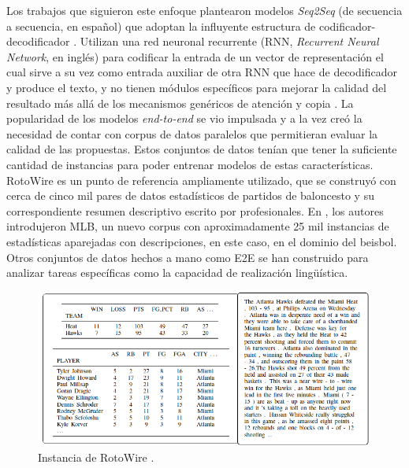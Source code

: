     Los trabajos que siguieron este enfoque  plantearon modelos \emph{Seq2Seq} (de secuencia a secuencia, en español) que adoptan la 
influyente estructura de codificador-decodificador . Utilizan una red neuronal recurrente (RNN, \emph{Recurrent Neural Network}, en inglés) 
para codificar la entrada de un vector de representación el cual sirve a su vez como entrada auxiliar de otra RNN que hace de decodificador y produce el texto, y no tienen módulos 
específicos para mejorar la calidad del resultado más allá de los mecanismos gen\'ericos de atención y copia . La popularidad de los modelos 
\emph{end-to-end} se vio impulsada y a la vez creó la necesidad de contar con corpus de datos paralelos que permitieran evaluar la calidad de las propuestas. Estos conjuntos de datos tenían que 
tener la suficiente cantidad de instancias para poder entrenar modelos de estas características. RotoWire  es un punto de referencia ampliamente utilizado, que se construyó con cerca de 
cinco mil pares de datos estadísticos de partidos de baloncesto y su correspondiente resumen descriptivo escrito por profesionales. En , los autores introdujeron MLB, un nuevo corpus con aproximadamente 
25 mil instancias de estadísticas aparejadas con descripciones, en este caso, en el dominio del beisbol. Otros conjuntos de datos hechos a mano como E2E  se han construido para analizar tareas espec\'ificas 
como la capacidad de realización lingüística.

        \begin{figure}[!]
            \begin{center}
                \includegraphics[width=\textwidth]{Graphics/rotowire_instancia.png}
            \end{center}
            \caption{Instancia de RotoWire .}
            \label{fig_RotoWire}
        \end{figure}

